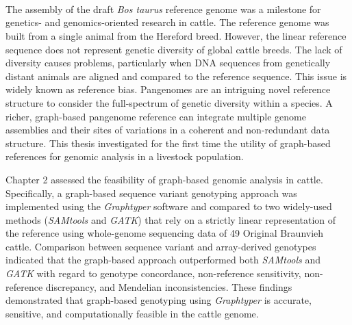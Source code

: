 \documentclass[11 pt, a4paper, notitlepage, twoside]{report}
\begin{document}
\newcommand*{\BuildingFromMainFile}{}



\iftwoside
\newpage
\thispagestyle{empty}
\ 
\newpage
\fi


\newpage

\setcounter{tocdepth}{1}
\hypersetup{linkcolor=black}


{}
\tableofcontents

\newpage

{}
\listoffigures 
\newpage

{}
\listoftables 
\newpage

{}
\section*{}
\thispagestyle{plain}

\setlength{\parskip}{\baselineskip}
\doublespacing
The assembly of the draft \emph{Bos taurus }reference genome was a milestone for genetics- and genomics-oriented research in cattle. The reference genome was built from a single animal from the Hereford breed. However, the linear reference sequence does not represent genetic diversity of global cattle breeds. The lack of diversity causes problems, particularly when DNA sequences from genetically distant animals are aligned and compared to the reference sequence. This issue is widely known as reference bias. Pangenomes are an intriguing novel reference structure to consider the full-spectrum of genetic diversity within a species. A richer, graph-based pangenome reference can integrate multiple  genome assemblies and their sites of variations in a coherent and non-redundant data structure. This thesis investigated for the first time the utility of graph-based references for genomic analysis in a livestock population.

Chapter 2 assessed the feasibility of graph-based genomic analysis in cattle. Specifically, a graph-based sequence variant genotyping approach was implemented using the\emph{ Graphtyper} software and compared to two widely-used methods (\emph{SAMtools } and \emph{GATK}) that rely on a strictly linear representation of the reference using whole-genome sequencing data of 49 Original Braunvieh cattle. Comparison between sequence variant and array-derived genotypes indicated that the graph-based approach outperformed both \emph{SAMtools} and \emph{GATK} with regard to genotype concordance, non-reference sensitivity, non-reference discrepancy, and Mendelian inconsistencies. These findings demonstrated that graph-based genotyping using \emph{Graphtyper} is accurate, sensitive, and computationally feasible in the cattle genome. 
\end{document}
